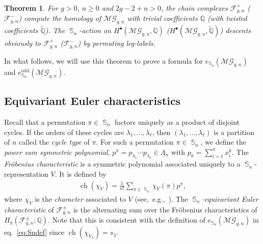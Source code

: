 \documentclass[oneside]{amsart}
\newtheorem{theorem}{Theorem}[section]
\theoremstyle{remark}
\newcommand{\Q}{\mathbb{Q}}
\newcommand{\tQ}{\widetilde{\Q}}
\DeclareMathOperator{\SG}{{\mathbb S}}
\newcommand{\ch}{\operatorname{ch}}
\newcommand{\MG}{\mathcal{MG}}
\newcommand{\F}{\mathcal{F}}
\begin{document}
%
%
%
%
%

\begin{theorem}
\label{thm:forested_graph_complex}
For $g > 0$,  $n\geq 0$ and $2g-2+n > 0$,
the chain complexes $\F_{g,n}^{+}$ ($\F_{g,n}^{-}$)
compute the homology of $\MG_{g,n}$ with trivial coefficients $\Q$ (with twisted coefficients $\tQ$). 
The $\SG_n$-action on $H^\bullet(\MG_{g,n},\Q)$ ($H^\bullet(\MG_{g,n},\tQ)$) descents obviously to $\F_{g,n}^+$ ($\F_{g,n}^-$) by permuting  leg-labels.
\end{theorem}

%

%
%
%
%
%
%
%
%
%
%
%
%
%
%
%
%

%

%

%
%
%
%
%
%
%

%

In what follows, we will use this theorem to prove a formula for 
%
$e_{\SG_n}(\MG_{g,n})$ and $e^\mathrm{odd}_{\SG_n}(\MG_{g,n})$.

\subsection{Equivariant Euler characteristics}

%
%
%
%
%
%
%

Recall that a permutation $\pi \in \SG_n$ factors uniquely as a product of disjoint cycles. 
If the orders of these cycles are $\lambda_1, \ldots, \lambda_\ell$, 
%
then %
$(\lambda_1,\ldots,\lambda_\ell)$ is a partition of $n$ called the \emph{cycle type} of $\pi$. %
%
%
For such a permutation $\pi \in \SG_n$, we define the \emph{power sum symmetric polynomial},
%
$p^\pi = p_{\lambda_1} \cdots p_{\lambda_\ell} \in \Lambda_n$
with $p_k=\sum_{i=1}^n x_i^k$. %
%
%
%
%
%
The  \emph{Fr\"obenius characteristic} is a symmetric polynomial associated uniquely to a $\SG_n$-representation $V$. It is defined by 
\begin{align*}  \ch(\chi_{V}) = \frac{1}{n!} \sum_{\pi \in \SG_n} \chi_{V}(\pi) p^\pi, \end{align*}
where $\chi_V$ is the \emph{character} associated to $V$ (see,~e.g.,~\cite[\S7.18]{stanley1997enumerative2}). 
%
%
%
%
%
%
%
%
%
%
%
The
\emph{$\SG_n$-equivariant Euler characteristic} of $\F_{g,n}^\pm$ is the alternating sum over the Fr\"obenius characteristics of $H_k(\F_{g,n}^\pm;\Q)$. Note that this is consistent with the definition of $e_{\SG_n}(\MG_{g,n})$ in eq.~\eqref{eq:Sndef} since $\ch(\chi_{V_\lambda}) = s_\lambda$.
\end{document}
